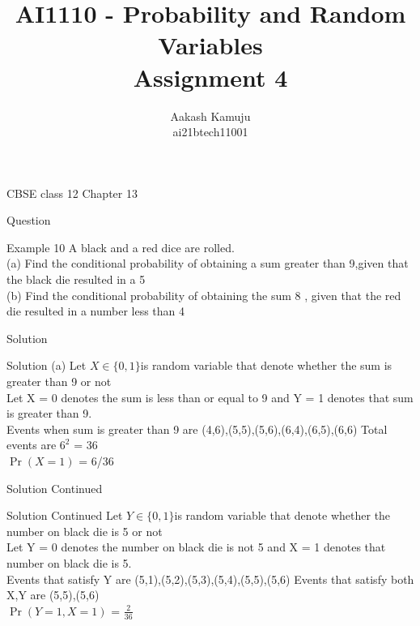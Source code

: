 \documentclass{beamer}
\title{AI1110 - Probability and Random Variables \\
        Assignment 4}
\author{Aakash Kamuju \\
        ai21btech11001}
\providecommand{\pr}[1]{\ensuremath{\Pr\left(#1\right)}}
\begin{document}
\maketitle
    \begin{frame}{CBSE class 12 Chapter 13}
        \begin{section}{Question}
            \begin{block}{Example 10}
             A black and a red dice are rolled.\\
(a) Find the conditional probability of obtaining a sum greater than 9,given that the black die resulted in a 5\\
(b) Find the conditional probability of obtaining the sum 8 , given that the red die resulted in a number less than 4
   \end{block}
    \end{section}
    \end{frame}
    \begin{frame}
        \begin{section}{Solution}
            \begin{block}{Solution}
           (a) Let $X \in \{0,1\} $is random variable that denote whether the sum is greater than 9 or not \\Let X = 0 denotes the sum is less than or equal to 9 and Y = 1 denotes that sum is greater than 9.\\
           
              Events when sum is greater than 9 are (4,6),(5,5),(5,6),(6,4),(6,5),(6,6)
              Total events are $6^2 $ = 36\\
              \pr{X =1} = 6/36
            
            \end{block}
            \end{section}
            \end{frame}
    \begin{frame}
        \begin{section}{Solution Continued}
            \begin{block}{Solution Continued}
             Let $Y \in \{0,1\} $is random variable that denote whether the number on black die is 5 or not \\Let Y = 0 denotes the number on black die is not 5 and X = 1 denotes that number on black die is 5.\\
             Events that satisfy Y are (5,1),(5,2),(5,3),(5,4),(5,5),(5,6)
             Events that satisfy both X,Y are (5,5),(5,6)\\
             \pr{Y = 1,X = 1} = $\frac{2}{36}$
     \end{block}         
    \end{section}
    \end{frame}
\end{document}
